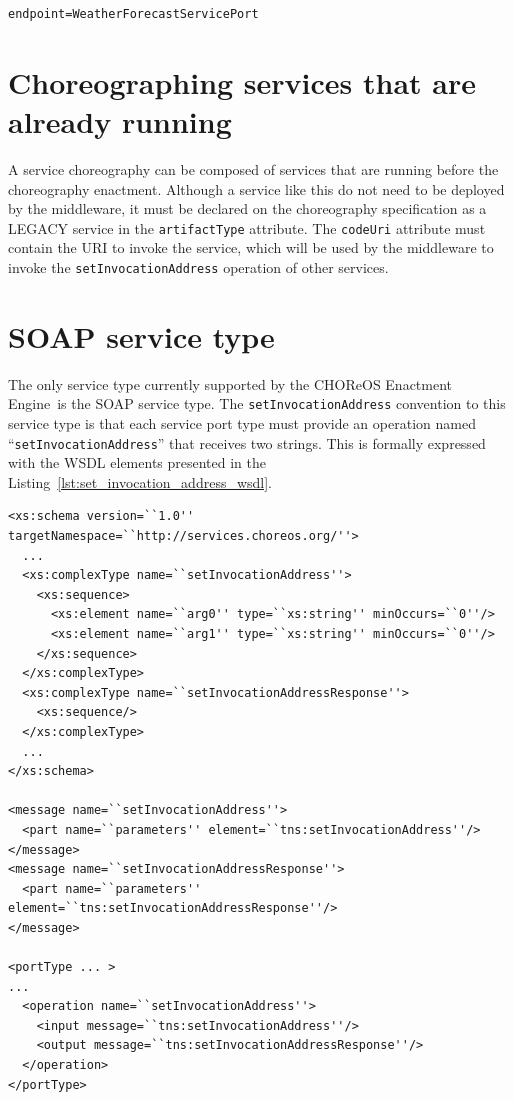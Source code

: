 \documentclass[a4paper, 10pt]{article}
\newcommand{\ee}{CHOReOS Enactment Engine}
\begin{document}
{\footnotesize
\begin{lstlisting}[caption=LTS file of a simple coordination delegate that acts as a proxy, label=lst:weather_lts] 
endpoint=WeatherForecastServicePort
\end{lstlisting}
}

\section{Choreographing services that are already running}

A service choreography can be composed of services that are running before the choreography enactment. Although a service like this do not need to be deployed by the middleware, it must be declared on the choreography specification as a LEGACY 	service in the \texttt{artifactType} attribute. The \texttt{codeUri} attribute must contain the URI to invoke the service, which will be used by the middleware to invoke the \texttt{setInvocationAddress} operation of other services. 

\section{SOAP service type}

The only service type currently supported by the \ee\ is the SOAP service type. The \texttt{setInvocationAddress} convention to this service type is that each service port type must provide an operation named ``\texttt{setInvocationAddress}'' that receives two strings. This is formally expressed with the WSDL elements presented in the Listing~\ref{lst:set_invocation_address_wsdl}. 

{\footnotesize
\begin{lstlisting}[caption=Parts of the service WSDL that define the \texttt{setInvocationAddress} operation, label=lst:set_invocation_address_wsdl] 
<xs:schema version=``1.0'' targetNamespace=``http://services.choreos.org/''>
  ...
  <xs:complexType name=``setInvocationAddress''>
    <xs:sequence>
      <xs:element name=``arg0'' type=``xs:string'' minOccurs=``0''/>
      <xs:element name=``arg1'' type=``xs:string'' minOccurs=``0''/>
    </xs:sequence>
  </xs:complexType>
  <xs:complexType name=``setInvocationAddressResponse''>
    <xs:sequence/>
  </xs:complexType>
  ...
</xs:schema>

<message name=``setInvocationAddress''>
  <part name=``parameters'' element=``tns:setInvocationAddress''/>
</message>
<message name=``setInvocationAddressResponse''>
  <part name=``parameters'' element=``tns:setInvocationAddressResponse''/>
</message>

<portType ... >
...
  <operation name=``setInvocationAddress''>
    <input message=``tns:setInvocationAddress''/>
    <output message=``tns:setInvocationAddressResponse''/>
  </operation>
</portType>
\end{lstlisting}
}
\end{document}
